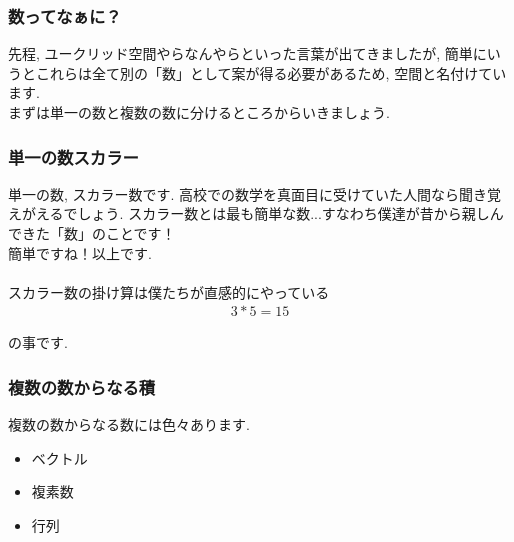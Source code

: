 \documentclass[11pt,a4paper]{jsarticle}
\begin{document}
\subsubsection{数ってなぁに？}
先程, ユークリッド空間やらなんやらといった言葉が出てきましたが, 簡単にいうとこれらは全て別の「数」として案が得る必要があるため, 空間と名付けています.\\
まずは単一の数と複数の数に分けるところからいきましょう.\\

\subsubsection{単一の数スカラー}
単一の数, スカラー数です. 高校での数学を真面目に受けていた人間なら聞き覚えがえるでしょう. スカラー数とは最も簡単な数...すなわち僕達が昔から親しんできた「数」のことです！\\
簡単ですね！以上です.\\
\\
スカラー数の掛け算は僕たちが直感的にやっている
\begin{eqnarray}
3 * 5 = 15
\end{eqnarray}

の事です.
\\

\subsubsection{複数の数からなる積}
複数の数からなる数には色々あります.\\
\begin{itemize}
 \item ベクトル
 \item 複素数
 \item 行列
\end{itemize}
\end{document}
